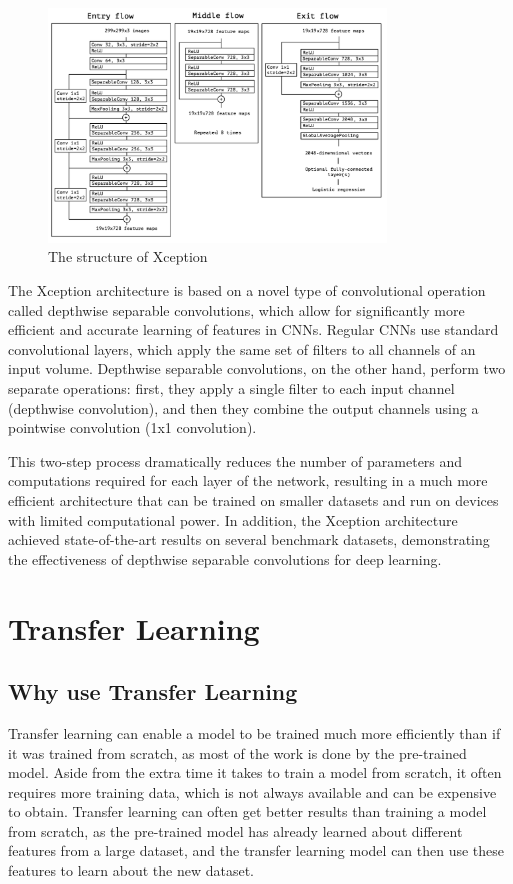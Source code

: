 \documentclass[]{final_report}
\begin{document}
\begin{figure}[ht!]
  \centering
  \includegraphics[width=0.8\textwidth]{images/Xception-structure.png}
  \caption{The structure of Xception\cite{DBLP:journals/corr/Chollet16a}}
  \label{fig:xception-structure}
\end{figure}

The Xception architecture is based on a novel type of convolutional operation called depthwise separable convolutions, which allow for significantly more efficient and accurate learning of features in CNNs. Regular CNNs use standard convolutional layers, which apply the same set of filters to all channels of an input volume. Depthwise separable convolutions, on the other hand, perform two separate operations: first, they apply a single filter to each input channel (depthwise convolution), and then they combine the output channels using a pointwise convolution (1x1 convolution).

This two-step process dramatically reduces the number of parameters and computations required for each layer of the network, resulting in a much more efficient architecture that can be trained on smaller datasets and run on devices with limited computational power. In addition, the Xception architecture achieved state-of-the-art results on several benchmark datasets, demonstrating the effectiveness of depthwise separable convolutions for deep learning.

\chapter{Transfer Learning}

\section{Why use Transfer Learning}
Transfer learning can enable a model to be trained much more efficiently than if it was trained from scratch, as most of the work is done by the pre-trained model.
Aside from the extra time it takes to train a model from scratch, it often requires more training data, which is not always available and can be expensive to obtain.
Transfer learning can often get better results than training a model from scratch, as the pre-trained model has already learned about different features from a large dataset,
and the transfer learning model can then use these features to learn about the new dataset.
\end{document}
